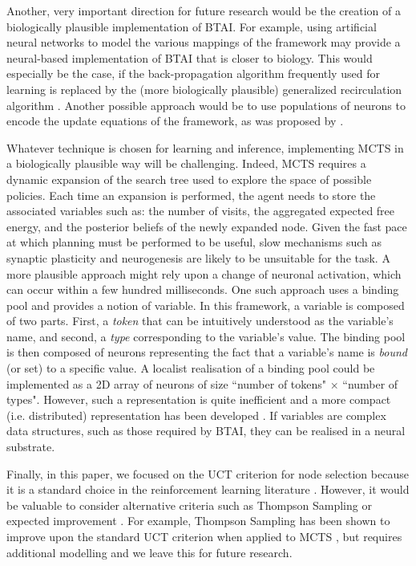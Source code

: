 \documentclass[twoside,11pt]{article}
\begin{document}
Another, very important direction for future research would be the creation of a biologically plausible implementation of BTAI. For example, using artificial neural networks to model the various mappings of the framework may provide a neural-based implementation of BTAI that is closer to biology. This would especially be the case, if the back-propagation algorithm frequently used for learning is replaced by the (more biologically plausible) generalized recirculation algorithm \citep{DBLP:journals/neco/OReilly96}. Another possible approach would be to use populations of neurons to encode the update equations of the framework, as was proposed by \citet{believe}.

Whatever technique is chosen for learning and inference, implementing MCTS in a biologically plausible way will be challenging. Indeed, MCTS requires a dynamic expansion of the search tree used to explore the space of possible policies. Each time an expansion is performed, the agent needs to store the associated variables such as: the number of visits, the aggregated expected free energy, and the posterior beliefs of the newly expanded node. Given the fast pace at which planning must be performed to be useful, slow mechanisms such as synaptic plasticity and neurogenesis are likely to be unsuitable for the task. A more plausible approach might rely upon a change of neuronal activation, which can occur within a few hundred milliseconds. One such approach uses a binding pool \citep{bowman2007simultaneous} and provides a notion of variable. In this framework, a variable is composed of two parts. First, a \textit{token} that can be intuitively understood as the variable's name, and second, a \textit{type} corresponding to the variable's value. The binding pool is then composed of neurons representing the fact that a variable's name is \textit{bound} (or set) to a specific value. A localist realisation of a binding pool could be implemented as a 2D array of neurons of size ``number of tokens" $\times$ ``number of types". However, such a representation is quite inefficient and a more compact (i.e. distributed) representation has been developed \citep{wyble2006neural}. If variables are complex data structures, such as those required by BTAI, they can be realised in a neural substrate.

Finally, in this paper, we focused on the UCT criterion for node selection because it is a standard choice in the reinforcement learning literature \citep{Go,MuZero}. However, it would be valuable to consider alternative criteria such as Thompson Sampling \citep{ThompsonOriginal,TutoThompson,AI_and_Thompson} or expected improvement \citep{EI_for_BO,ExpectedInprovement}. For example, Thompson Sampling has been shown to improve upon the standard UCT criterion when applied to MCTS \citep{Thompson_and_MCTS}, but requires additional modelling and we leave this for future research.
\end{document}
